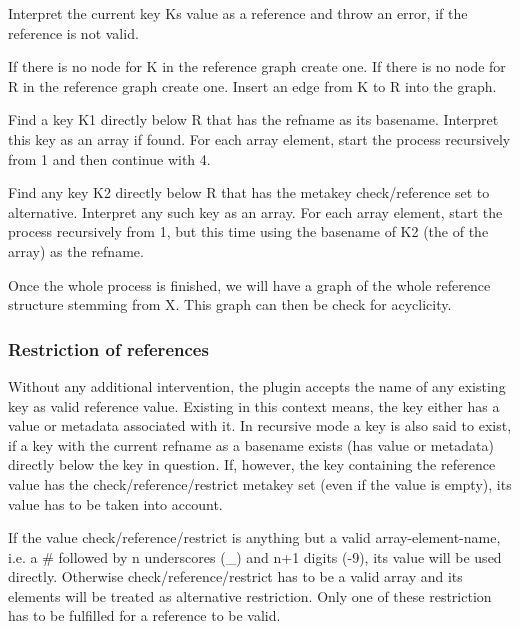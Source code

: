 \begin{DoxyEnumerate}
\item Interpret the current key {\ttfamily K}s value as a reference and throw an error, if the reference is not valid.
\item If there is no node for {\ttfamily K} in the reference graph create one. If there is no node for {\ttfamily R} in the reference graph create one. Insert an edge from {\ttfamily K} to {\ttfamily R} into the graph.
\item Find a key {\ttfamily K1} directly below {\ttfamily R} that has the {\ttfamily refname} as its basename. Interpret this key as an array if found. For each array element, start the process recursively from 1 and then continue with 4.
\item Find any key {\ttfamily K2} directly below {\ttfamily R} that has the metakey {\ttfamily check/reference} set to {\ttfamily alternative}. Interpret any such key as an array. For each array element, start the process recursively from 1, but this time using the basename of {\ttfamily K2} (the of the array) as the {\ttfamily refname}.
\end{DoxyEnumerate}

Once the whole process is finished, we will have a graph of the whole reference structure stemming from {\ttfamily X}. This graph can then be check for acyclicity.

\subsubsection*{Restriction of references}

Without any additional intervention, the plugin accepts the name of any existing key as valid reference value. Existing in this context means, the key either has a value or metadata associated with it. In recursive mode a key is also said to exist, if a key with the current {\ttfamily refname} as a basename exists (has value or metadata) directly below the key in question. If, however, the key containing the reference value has the {\ttfamily check/reference/restrict} metakey set (even if the value is empty), its value has to be taken into account.

If the value {\ttfamily check/reference/restrict} is anything but a valid array-\/element-\/name, i.\+e. a {\ttfamily \#} followed by {\ttfamily n} underscores ({\ttfamily \+\_\+}) and {\ttfamily n+1} digits ({-\/9}), its value will be used directly. Otherwise {\ttfamily check/reference/restrict} has to be a valid array and its elements will be treated as alternative restriction. Only one of these restriction has to be fulfilled for a reference to be valid.


